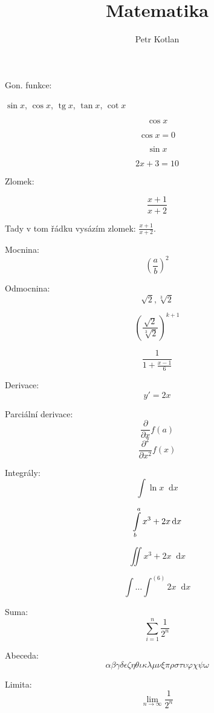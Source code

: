 \documentclass[a4paper, 12pt]{article}
\title{Matematika}
\author{Petr Kotlan}
\date{}
\newcommand*\diff{\mathop{}\!\mathrm{d}}
\DeclareMathOperator{\tg}{tg}
\begin{document}
\maketitle


Gon. funkce:

$\sin{x}$, $\cos{x}$, $\tg{x}$, $\tan{x}$, $\cot{x}$

$$ \cos{x} $$

\begin{equation*}
    \cos{x} = 0
\end{equation*}


\begin{equation}
    \sin{x}
\end{equation}

\begin{equation}
    2x + 3 = 10
\end{equation}

Zlomek:

\begin{equation}
    \frac{x + 1}{x + 2}
\end{equation}

Tady v tom řádku vysázím zlomek: $\frac{x + 1}{x + 2}$.

Mocnina:
$$ \left(\frac{a}{b}\right)^2 $$

Odmocnina:
$$ \sqrt{2}, \sqrt[3]{2} $$

$$ \left(
    \frac{\sqrt{2}}{\sqrt[3]{2}}
    \right)^{k + 1} $$

$$ \frac{1}{1 + \frac{x - 1}{6}} $$

Derivace:
$$ y'=2x $$

Parciální derivace:
$$ \frac{\partial}{\partial x} f(a)$$
$$ \frac{\partial^2}{\partial x^2} f(x)$$

Integrály:
$$ \int \ln{x} \diff{x} $$

$$ \int_{b}^{a}\limits x^3 + 2x \diff{x} $$  %

$$ \iint x^3 + 2x \diff{x} $$

$$ \int \dots \int^{(6)} 2x \diff{x} $$


Suma:
$$ \sum_{i=1}^{n}  \frac{1}{2^n} $$

Abeceda:
$$ \alpha \beta \gamma \delta \epsilon \zeta \eta \theta \iota \kappa \lambda \mu \nu \xi \pi \rho \sigma \tau \upsilon \varphi \chi \psi \omega  $$

Limita:
$$ \lim_{n \to \infty} \frac{1}{2^n} $$
\end{document}
